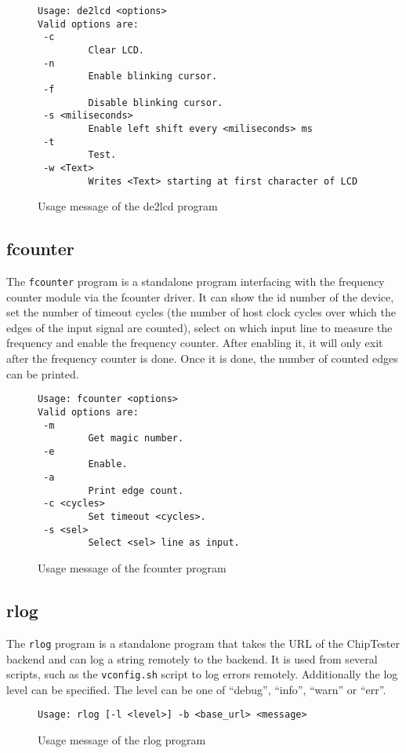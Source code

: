 \begin{figure}[h!]
\lstset{basicstyle=\scriptsize\ttfamily}
\begin{lstlisting}
Usage: de2lcd <options>
Valid options are:
 -c
         Clear LCD.
 -n
         Enable blinking cursor.
 -f
         Disable blinking cursor.
 -s <miliseconds>
         Enable left shift every <miliseconds> ms
 -t
         Test.
 -w <Text>
         Writes <Text> starting at first character of LCD
\end{lstlisting}
\caption{Usage message of the de2lcd program}
\end{figure}


\subsection{fcounter}
The \texttt{fcounter} program is a standalone program interfacing with the frequency
counter module via the fcounter driver. It can show the id number of the device,
set the number of timeout cycles (the number of host clock cycles over which the
edges of the input signal are counted), select on which input line to measure the
frequency and enable the frequency counter. After enabling it, it will only exit
after the frequency counter is done. Once it is done, the number of counted edges
can be printed.

\begin{figure}[h!]
\lstset{basicstyle=\scriptsize\ttfamily}
\begin{lstlisting}
Usage: fcounter <options>
Valid options are:
 -m
         Get magic number.
 -e
         Enable.
 -a
         Print edge count.
 -c <cycles>
         Set timeout <cycles>.
 -s <sel>
         Select <sel> line as input.
\end{lstlisting}
\caption{Usage message of the fcounter program}
\end{figure}


\subsection{rlog}
The \texttt{rlog} program is a standalone program that takes the URL of the ChipTester
backend and can log a string remotely to the backend. It is used from several scripts, such
as the \texttt{vconfig.sh} script to log errors remotely. Additionally the log level can be
specified. The level can be one of ``debug'', ``info'', ``warn'' or ``err''.
\begin{figure}[h!]
 \lstset{basicstyle=\scriptsize\ttfamily}
\begin{lstlisting}
Usage: rlog [-l <level>] -b <base_url> <message>
\end{lstlisting}
\caption{Usage message of the rlog program}
\end{figure}


